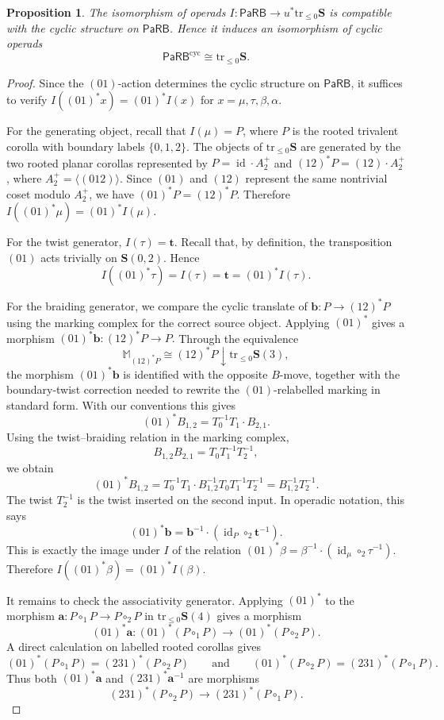 \documentclass{amsart}
\newcommand{\bS}{\mathbf{S}}
\newcommand{\PaRB}{\mathsf{PaRB}}
\newcommand{\id}{\operatorname{id}}
\newcommand{\trun}[1]{\mathrm{tr}_{\leq{#1}}}
\newtheorem{prop}[theorem]{Proposition}%
\theoremstyle{definition}
\numberwithin{equation}{section}
\begin{document}
\begin{prop}\label{prop:PaRB-cyclic-is-S0}
The isomorphism of operads $I:\PaRB\to u^*\trun{0}\bS$ is compatible with the cyclic structure on $\PaRB$. Hence it induces an isomorphism of cyclic operads
\[
\PaRB^{\mathrm{cyc}}\cong \trun{0}\bS.
\]
\end{prop}

\begin{proof}
Since the $(01)$-action determines the cyclic structure on $\PaRB$, it suffices to verify $I((01)^*x)=(01)^*I(x)$ for $x=\mu,\tau,\beta,\alpha$.


For the generating object, recall that $I(\mu)=P$, where $P$ is the rooted trivalent corolla with boundary labels $\{0,1,2\}$. The objects of $\trun{0}\bS$ are generated by the two rooted planar corollas represented by $P=\id\cdot A_2^+$ and $(12)^*P=(12)\cdot A_2^+$, where $A_2^+=\langle(012)\rangle$. Since $(01)$ and $(12)$ represent the same nontrivial coset modulo $A_2^+$, we have $(01)^*P=(12)^*P$. Therefore $I((01)^*\mu)=(01)^*I(\mu)$.

For the twist generator, $I(\tau)=\mathbf{t}$. Recall that, by definition, the transposition
$(01)$ acts trivially on $\bS(0,2)$. Hence \[ I((01)^*\tau)=I(\tau)=\mathbf{t}=(01)^*I(\tau). \]

For the braiding generator, we compare the cyclic translate of $\mathbf b:P\to(12)^*P$ using the marking complex for the correct source object. Applying $(01)^*$ gives a morphism $(01)^*\mathbf{b}:(12)^*P\longrightarrow P.$
Through the equivalence
\[
\mathbb{M}_{(12)^*P}\cong (12)^*P\downarrow \trun{0}\bS(3),
\]
the morphism $(01)^*\mathbf{b}$ is identified with the opposite $B$-move, together with the boundary-twist correction needed to rewrite the $(01)$-relabelled marking in standard form. With our conventions this gives
\[
(01)^*B_{1,2}=T_0^{-1}T_1\cdot B_{2,1}.
\]
Using the twist--braiding relation in the marking complex,
\[
B_{1,2}B_{2,1}=T_0T_1^{-1}T_2^{-1},
\]
we obtain
\[
(01)^*B_{1,2} = T_0^{-1}T_1\cdot B_{1,2}^{-1}T_0T_1^{-1}T_2^{-1} = B_{1,2}^{-1}T_2^{-1}.
\]
The twist $T_2^{-1}$ is the twist inserted on the second input. In operadic notation, this says
\[
(01)^*\mathbf{b} = \mathbf{b}^{-1}\cdot(\id_P\circ_2\mathbf{t}^{-1}).
\]
This is exactly the image under $I$ of the relation $(01)^*\beta=\beta^{-1}\cdot(\id_{\mu}\circ_2\tau^{-1}).$  Therefore $I((01)^*\beta)=(01)^*I(\beta)$.


It remains to check the associativity generator. Applying $(01)^*$ to the morphism $\mathbf{a}:P\circ_1P\longrightarrow P\circ_2P$ in $\trun{0}\bS(4)$   gives a morphism
\[
(01)^*\mathbf{a}: (01)^*(P\circ_1P)\longrightarrow (01)^*(P\circ_2P).
\]
A direct calculation on labelled rooted corollas gives
\[
(01)^*(P\circ_1P)=(231)^*(P\circ_2P)
\qquad \text{and} \qquad (01)^*(P\circ_2P)=(231)^*(P\circ_1P).
\]
Thus both $(01)^*\mathbf{a}$ and $(231)^*\mathbf{a}^{-1}$ are morphisms
\[
(231)^*(P\circ_2P)\longrightarrow (231)^*(P\circ_1P).
\]


\end{proof}
\end{document}
